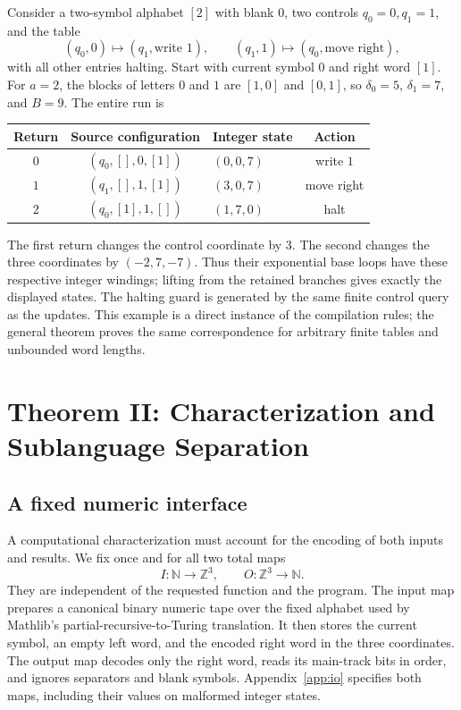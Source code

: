\documentclass[11pt]{article}
\numberwithin{equation}{section}
\theoremstyle{definition}
\theoremstyle{remark}
\newcommand{\N}{\mathbb N}
\newcommand{\Z}{\mathbb Z}
\begin{document}
Consider a two-symbol alphabet $[2]$ with blank $0$, two controls
$q_0=0,q_1=1$, and the table
\[
 (q_0,0)\mapsto(q_1,\text{write }1),\qquad
 (q_1,1)\mapsto(q_0,\text{move right}),
\]
with all other entries halting. Start with current symbol $0$ and
right word $[1]$. For $a=2$, the blocks of letters $0$ and $1$ are
$[1,0]$ and $[0,1]$, so $\delta_0=5$, $\delta_1=7$, and $B=9$.
The entire run is
\begin{center}
\begin{tabular}{@{}cclc@{}}
\toprule
Return & Source configuration & Integer state & Action\\
\midrule
$0$ & $(q_0,[],0,[1])$ & $(0,0,7)$ & write $1$\\
$1$ & $(q_1,[],1,[1])$ & $(3,0,7)$ & move right\\
$2$ & $(q_0,[1],1,[])$ & $(1,7,0)$ & halt\\
\bottomrule
\end{tabular}
\end{center}
The first return changes the control coordinate by $3$. The second
changes the three coordinates by $(-2,7,-7)$. Thus their exponential
base loops have these respective integer windings; lifting from the
retained branches gives exactly the displayed states. The halting
guard is generated by the same finite control query as the updates.
This example is a direct instance of the compilation rules; the
general theorem proves the same correspondence for arbitrary finite
tables and unbounded word lengths.

\section{Theorem II: Characterization and Sublanguage Separation}
\label{sec:characterization}

\subsection{A fixed numeric interface}

A computational characterization must account for the encoding of
both inputs and results. We fix once and for all two total maps
\begin{equation}\label{eq:io}
 I:\N\longrightarrow\Z^3,\qquad O:\Z^3\longrightarrow\N.
\end{equation}
They are independent of the requested function and the program.
The input map prepares a canonical binary numeric tape over the fixed
alphabet used by Mathlib's partial-recursive-to-Turing translation.
It then stores the current symbol, an empty left word, and the encoded
right word in the three coordinates. The output map decodes only the
right word, reads its main-track bits in order, and ignores separators
and blank symbols. Appendix~\ref{app:io} specifies both maps, including
their values on malformed integer states.
\end{document}
